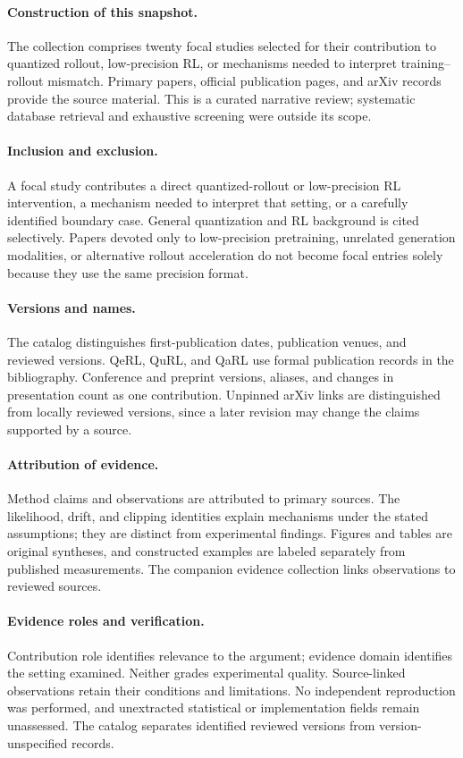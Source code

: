 \paragraph{Construction of this snapshot.}
The collection comprises twenty focal studies selected for their contribution to quantized rollout, low-precision RL, or mechanisms needed to interpret training--rollout mismatch. Primary papers, official publication pages, and arXiv records provide the source material. This is a curated narrative review; systematic database retrieval and exhaustive screening were outside its scope.

\paragraph{Inclusion and exclusion.}
A focal study contributes a direct quantized-rollout or low-precision RL intervention, a mechanism needed to interpret that setting, or a carefully identified boundary case. General quantization and RL background is cited selectively. Papers devoted only to low-precision pretraining, unrelated generation modalities, or alternative rollout acceleration do not become focal entries solely because they use the same precision format.

\paragraph{Versions and names.}
The catalog distinguishes first-publication dates, publication venues, and reviewed versions. QeRL, QuRL, and QaRL use formal publication records in the bibliography. Conference and preprint versions, aliases, and changes in presentation count as one contribution. Unpinned arXiv links are distinguished from locally reviewed versions, since a later revision may change the claims supported by a source.

\paragraph{Attribution of evidence.}
Method claims and observations are attributed to primary sources. The likelihood, drift, and clipping identities explain mechanisms under the stated assumptions; they are distinct from experimental findings. Figures and tables are original syntheses, and constructed examples are labeled separately from published measurements. The companion evidence collection links observations to reviewed sources.

\paragraph{Evidence roles and verification.}
Contribution role identifies relevance to the argument; evidence domain identifies the setting examined. Neither grades experimental quality. Source-linked observations retain their conditions and limitations. No independent reproduction was performed, and unextracted statistical or implementation fields remain unassessed. The catalog separates identified reviewed versions from version-unspecified records.

